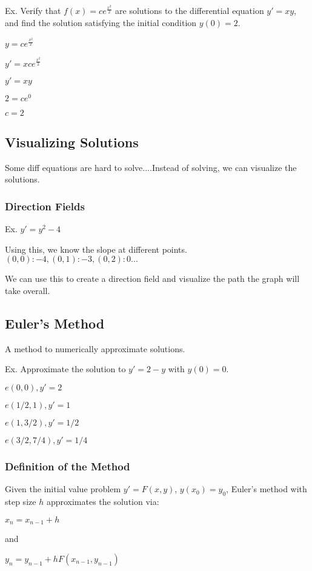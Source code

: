 \documentclass{article}
\begin{document}
Ex. Verify that $f(x) = ce^{\frac{x^2}{2}}$ are solutions to the differential equation $y'=xy$, and find the solution satisfying the initial condition $y(0) = 2$.

$y= ce^{\frac{x^2}{2}}$

$y' = xce^{\frac{x^2}{2}}$

$y' = xy$


$2 = ce^0$

$c=2$

\subsection{Visualizing Solutions}

Some diff equations are hard to solve....Instead of solving, we can visualize the solutions.

\subsubsection{Direction Fields}

Ex. $y' = y^2-4$

Using this, we know the slope at different points. $(0,0): -4, (0,1): -3, (0,2): 0...$

We can use this to create a direction field and visualize the path the graph will take overall.

\subsection{Euler's Method}

A method to numerically approximate solutions.

Ex. Approximate the solution to $y'=2-y$ with $y(0) = 0$.

$e(0,0), y'=2$ 

$e(1/2,1), y'=1$

$e(1,3/2), y'=1/2$

$e(3/2, 7/4), y'=1/4$

\subsubsection{Definition of the Method}

Given the initial value problem $y'=F(x,y)$, $y(x_0) = y_0$, Euler's method with step size $h$ approximates the solution via: 

$x_n = x_{n-1} + h$

and 

$y_n = y_{n-1} + hF(x_{n-1}, y_{n-1 })$
\end{document}
